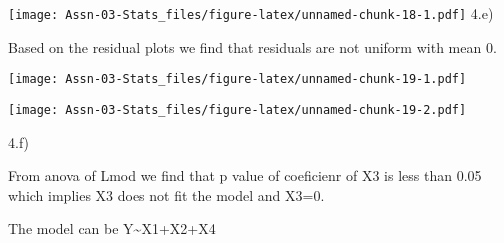\documentclass[
]{article}
\newenvironment{Shaded}{\begin{snugshade}}{\end{snugshade}}
\newcommand{\AttributeTok}[1]{\textcolor[rgb]{0.77,0.63,0.00}{#1}}
\newcommand{\DecValTok}[1]{\textcolor[rgb]{0.00,0.00,0.81}{#1}}
\newcommand{\FunctionTok}[1]{\textcolor[rgb]{0.00,0.00,0.00}{#1}}
\newcommand{\NormalTok}[1]{#1}
\newcommand{\SpecialCharTok}[1]{\textcolor[rgb]{0.00,0.00,0.00}{#1}}
\begin{document}
\texttt{[image: Assn-03-Stats\_files/figure-latex/unnamed-chunk-18-1.pdf]}
4.e)

Based on the residual plots we find that residuals are not uniform with
mean 0.

\begin{Shaded}
\end{Shaded}

\texttt{[image: Assn-03-Stats\_files/figure-latex/unnamed-chunk-19-1.pdf]}

\begin{Shaded}
\end{Shaded}

\texttt{[image: Assn-03-Stats\_files/figure-latex/unnamed-chunk-19-2.pdf]}

4.f)

From anova of Lmod we find that p value of coeficienr of X3 is less than
0.05 which implies X3 does not fit the model and X3=0.

The model can be Y\textasciitilde X1+X2+X4
\end{document}
